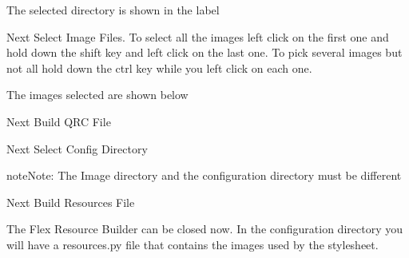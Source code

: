 \documentclass[letterpaper,10pt,english]{sphinxmanual}
\begin{document}

\sphinxAtStartPar
The selected directory is shown in the label


\sphinxAtStartPar
Next Select Image Files. To select all the images left click on the first one
and hold down the shift key and left click on the last one. To pick several
images but not all hold down the ctrl key while you left click on each one.


\sphinxAtStartPar
The images selected are shown below


\sphinxAtStartPar
Next Build QRC File


\sphinxAtStartPar
Next Select Config Directory


\begin{sphinxadmonition}{note}{Note:}
\sphinxAtStartPar
The Image directory and the configuration directory must be different
\end{sphinxadmonition}

\sphinxAtStartPar
Next Build Resources File


\sphinxAtStartPar
The Flex Resource Builder can be closed now. In the configuration directory you
will have a resources.py file that contains the images used by the stylesheet.
\end{document}
